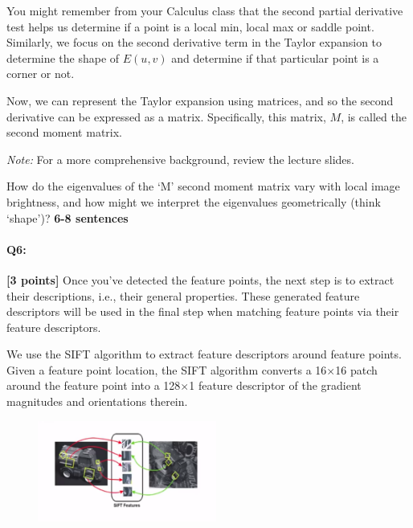 \documentclass[11pt]{article}
\begin{document}
You might remember from your Calculus class that the second partial derivative test helps us determine if a point is a local min, local max or saddle point. Similarly, we focus on the second derivative term in the Taylor expansion to determine the shape of $E(u, v)$ and determine if that particular point is a corner or not.

Now, we can represent the Taylor expansion using matrices, and so the second derivative can be expressed as a matrix. Specifically, this matrix, $M$, is called the second moment matrix.

\textit{Note:} For a more comprehensive background, review the lecture slides.

\begin{tcolorbox}[colback=orange!5!white,colframe=orange!75!black]
How do the eigenvalues of the `M' second moment matrix vary with local image brightness, and how might we interpret the eigenvalues geometrically (think `shape')? \textbf{6-8 sentences}
\end{tcolorbox}


\pagebreak
\paragraph{Q6:} \textbf{[3 points]}
Once you've detected the feature points, the next step is to extract their descriptions, i.e., their general properties. These generated feature descriptors will be used in the final step when matching feature points via their feature descriptors.

We use the SIFT algorithm to extract feature descriptors around feature points. Given a feature point location, the SIFT algorithm converts a 16$\times$16 patch around the feature point into a 128$\times$1 feature descriptor of the gradient magnitudes and orientations therein.

\begin{center}
\includegraphics[width=300px,height=125px]{images/sift.png} 
\end{center}
\end{document}
